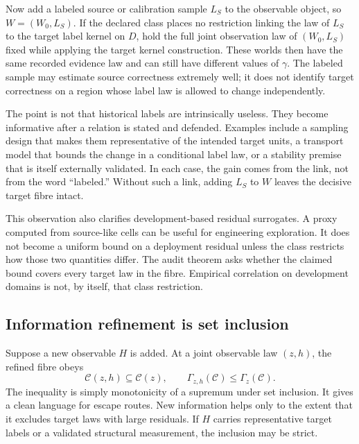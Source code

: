 Now add a labeled source or calibration sample $L_S$ to the observable object, so
$W=(W_0,L_S)$.  If the declared class places no restriction linking the law of $L_S$ to the target
label kernel on $D$, hold the full joint observation law of $(W_0,L_S)$ fixed while applying the
target kernel construction.  These worlds then have the same recorded evidence law and can still have different values of
$\gamma$.  The labeled sample may estimate source correctness extremely well; it does not identify
target correctness on a region whose label law is allowed to change independently.

The point is not that historical labels are intrinsically useless.  They become informative after
a relation is stated and defended.  Examples include a sampling design that makes them
representative of the intended target units, a transport model that bounds the change in a
conditional label law, or a stability premise that is itself externally validated.  In each case,
the gain comes from the link, not from the word ``labeled.''  Without such a link, adding $L_S$ to
$W$ leaves the decisive target fibre intact.

This observation also clarifies development-based residual surrogates.  A proxy computed from
source-like cells can be useful for engineering exploration.  It does not become a uniform bound
on a deployment residual unless the class restricts how those two quantities differ.  The audit
theorem asks whether the claimed bound covers every target law in the fibre.  Empirical correlation
on development domains is not, by itself, that class restriction.

\subsection{Information refinement is set inclusion}
\label{fr:subsec-information-refinement}

Suppose a new observable $H$ is added.  At a joint observable law $(z,h)$, the refined fibre obeys
\begin{equation}
  \mathcal C(z,h)\subseteq\mathcal C(z),
  \qquad
  \Gamma_{z,h}(\mathcal C)\le\Gamma_z(\mathcal C).
  \label{fr:eq-fibre-refinement}
\end{equation}
The inequality is simply monotonicity of a supremum under set inclusion.  It gives a clean language
for escape routes.  New information helps only to the extent that it excludes target laws with
large residuals.  If $H$ carries representative target labels or a validated structural
measurement, the inclusion may be strict.

